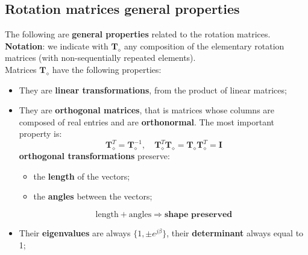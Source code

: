 \subsection{Rotation matrices general properties}
The following are \textbf{general properties} related to the rotation matrices. \textbf{Notation}: we indicate with $\mathbf{T}_{\diamond}$ any composition of the elementary rotation matrices (with non-sequentially repeated elements).\\
Matrices $\mathbf{T}_{\diamond}$ have the following properties:
\begin{itemize}
    \itemsep0em
    \item[\ding{70}] They are \textbf{linear transformations}, from the product of linear matrices;
    \item[\ding{70}] They are \textbf{orthogonal matrices}, that is matrices whose columns are composed of real entries and are \textbf{orthonormal}. The most important property is: 
    $$\mathbf{T}_{\diamond}^T=\mathbf{T}_{\diamond}^{-1}, \quad 
    \mathbf{T}_{\diamond}^{T}\mathbf{T}_{\diamond}=\mathbf{T}_{\diamond}\mathbf{T}_{\diamond}^T=\mathbf{I}$$
    \textbf{orthogonal transformations} preserve:
    \begin{itemize}
        \itemsep0em
        \item the \textbf{length} of the vectors;
        \item the \textbf{angles} between the vectors;
    \end{itemize}
    $$\text{length} + \text{angles} \Longrightarrow \textbf{shape preserved}$$
    \item[\ding{70}] Their \textbf{eigenvalues} are always $\{1, \pm e^{j\beta}\}$, their \textbf{determinant} always equal to 1;
\end{itemize} 

